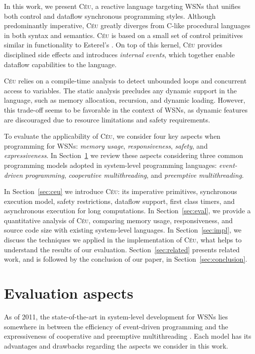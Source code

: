 \documentclass{sig-alternate-ipsn09}
\newcommand{\2}{\;\;}
\newcommand{\5}{\;\;\;\;\;}
\newcommand{\CEU}{\textsc{C\'{e}u}}
\begin{document}
In this work, we present \CEU, a reactive language targeting WSNs that unifies 
both control and dataflow synchronous programming styles.
Although predominantly imperative, \CEU{} greatly diverges from C-like 
procedural languages in both syntax and semantics.
\CEU{} is based on a small set of control primitives similar in functionality 
to Esterel's \cite{esterel.design}.
On top of this kernel, \CEU{} provides disciplined side effects and introduces 
\emph{internal events}, which together enable dataflow capabilities to the 
language.

\CEU{} relies on a compile-time analysis to detect unbounded loops and 
concurrent access to variables.
The static analysis precludes any dynamic support in the language, such as 
memory allocation, recursion, and dynamic loading.
However, this trade-off seems to be favorable in the context of WSNs, as 
dynamic features are discouraged due to resource limitations and safety 
requirements.

To evaluate the applicability of \CEU{}, we consider four key aspects when 
programming for WSNs: \emph{memory usage}, \emph{responsiveness}, 
\emph{safety}, and \emph{expressiveness}.
In Section~\ref{sec:aspects} we review these aspects considering three common 
programming models adopted in system-level programming languages: 
\emph{event-driven programming}, \emph{cooperative multithreading}, and 
\emph{preemptive multithreading}.

In Section~\ref{sec:ceu} we introduce \CEU: its imperative primitives, 
synchronous execution model, safety restrictions, dataflow support, first class 
timers, and asynchronous execution for long computations.
In Section~\ref{sec:eval}, we provide a quantitative analysis of \CEU, 
comparing memory usage, responsiveness, and source code size with existing 
system-level languages.
In Section~\ref{sec:impl}, we discuss the techniques we applied in the 
implementation of \CEU, what helps to understand the results of our evaluation.
Section~\ref{sec:related} presents related work, and is followed by the 
conclusion of our paper, in Section~\ref{sec:conclusion}.

\section{Evaluation aspects}
\label{sec:aspects}

As of 2011, the state-of-the-art in system-level development for WSNs lies 
somewhere in between the efficiency of event-driven programming and the 
expressiveness of cooperative and preemptive multithreading 
\cite{wsn.oses.2011}.
Each model has its  advantages and drawbacks regarding the aspects we consider 
in this work.
\end{document}
